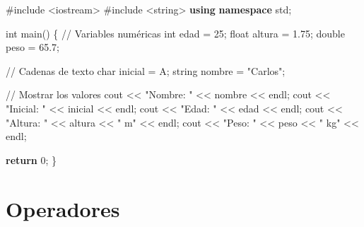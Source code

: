 \documentclass[
  11pt,
  a4paper,
  DIV=11,
  numbers=noendperiod]{scrreprt}
\newenvironment{Shaded}{\begin{snugshade}}{\end{snugshade}}
\newcommand{\CharTok}[1]{\textcolor[rgb]{0.13,0.47,0.30}{#1}}
\newcommand{\CommentTok}[1]{\textcolor[rgb]{0.37,0.37,0.37}{#1}}
\newcommand{\ControlFlowTok}[1]{\textcolor[rgb]{0.00,0.23,0.31}{\textbf{#1}}}
\newcommand{\DataTypeTok}[1]{\textcolor[rgb]{0.68,0.00,0.00}{#1}}
\newcommand{\DecValTok}[1]{\textcolor[rgb]{0.68,0.00,0.00}{#1}}
\newcommand{\FloatTok}[1]{\textcolor[rgb]{0.68,0.00,0.00}{#1}}
\newcommand{\ImportTok}[1]{\textcolor[rgb]{0.00,0.46,0.62}{#1}}
\newcommand{\KeywordTok}[1]{\textcolor[rgb]{0.00,0.23,0.31}{\textbf{#1}}}
\newcommand{\NormalTok}[1]{\textcolor[rgb]{0.00,0.23,0.31}{#1}}
\newcommand{\OperatorTok}[1]{\textcolor[rgb]{0.37,0.37,0.37}{#1}}
\newcommand{\PreprocessorTok}[1]{\textcolor[rgb]{0.68,0.00,0.00}{#1}}
\newcommand{\StringTok}[1]{\textcolor[rgb]{0.13,0.47,0.30}{#1}}
\begin{document}
\begin{Shaded}
\begin{Highlighting}[]
\PreprocessorTok{\#include }\ImportTok{\textless{}iostream\textgreater{}}
\PreprocessorTok{\#include }\ImportTok{\textless{}string\textgreater{}}
\KeywordTok{using} \KeywordTok{namespace}\NormalTok{ std}\OperatorTok{;}

\DataTypeTok{int}\NormalTok{ main}\OperatorTok{()} \OperatorTok{\{}
    \CommentTok{// Variables numéricas}
    \DataTypeTok{int}\NormalTok{ edad }\OperatorTok{=} \DecValTok{25}\OperatorTok{;}
    \DataTypeTok{float}\NormalTok{ altura }\OperatorTok{=} \FloatTok{1.75}\OperatorTok{;}
    \DataTypeTok{double}\NormalTok{ peso }\OperatorTok{=} \FloatTok{65.7}\OperatorTok{;}
    
    \CommentTok{// Cadenas de texto}
    \DataTypeTok{char}\NormalTok{ inicial }\OperatorTok{=} \CharTok{\textquotesingle{}A\textquotesingle{}}\OperatorTok{;}
\NormalTok{    string nombre }\OperatorTok{=} \StringTok{"Carlos"}\OperatorTok{;}
    
    \CommentTok{// Mostrar los valores}
\NormalTok{    cout }\OperatorTok{\textless{}\textless{}} \StringTok{"Nombre: "} \OperatorTok{\textless{}\textless{}}\NormalTok{ nombre }\OperatorTok{\textless{}\textless{}}\NormalTok{ endl}\OperatorTok{;}
\NormalTok{    cout }\OperatorTok{\textless{}\textless{}} \StringTok{"Inicial: "} \OperatorTok{\textless{}\textless{}}\NormalTok{ inicial }\OperatorTok{\textless{}\textless{}}\NormalTok{ endl}\OperatorTok{;}
\NormalTok{    cout }\OperatorTok{\textless{}\textless{}} \StringTok{"Edad: "} \OperatorTok{\textless{}\textless{}}\NormalTok{ edad }\OperatorTok{\textless{}\textless{}}\NormalTok{ endl}\OperatorTok{;}
\NormalTok{    cout }\OperatorTok{\textless{}\textless{}} \StringTok{"Altura: "} \OperatorTok{\textless{}\textless{}}\NormalTok{ altura }\OperatorTok{\textless{}\textless{}} \StringTok{" m"} \OperatorTok{\textless{}\textless{}}\NormalTok{ endl}\OperatorTok{;}
\NormalTok{    cout }\OperatorTok{\textless{}\textless{}} \StringTok{"Peso: "} \OperatorTok{\textless{}\textless{}}\NormalTok{ peso }\OperatorTok{\textless{}\textless{}} \StringTok{" kg"} \OperatorTok{\textless{}\textless{}}\NormalTok{ endl}\OperatorTok{;}

    \ControlFlowTok{return} \DecValTok{0}\OperatorTok{;}
\OperatorTok{\}}
\end{Highlighting}
\end{Shaded}


\chapter{Operadores}\label{operadores}
\end{document}
